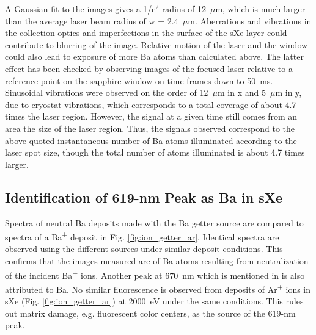 \documentclass[aps,pra,reprint,superscriptaddress]{revtex4-1}
\begin{document}

A Gaussian fit to the images gives a 1/e$^{2}$ radius of 12~$\mu$m, which is much larger than the average laser beam radius of w = 2.4~$\mu$m.  Aberrations and vibrations in the collection optics and imperfections in the surface of the sXe layer could contribute to blurring of the image.  Relative motion of the laser and the window could also lead to exposure of more Ba atoms than calculated above.  The latter effect has been checked by observing images of the focused laser relative to a reference point on the sapphire window on time frames down to 50~ms.  Sinusoidal vibrations were observed on the order of 12~$\mu$m in x and 5~$\mu$m in y, due to cryostat vibrations, which corresponds to a total coverage of about 4.7 times the laser region.  However, the signal at a given time still comes from an area the size of the laser region.  Thus, the signals observed correspond to the above-quoted instantaneous number of Ba atoms illuminated according to the laser spot size, though the total number of atoms illuminated is about 4.7 times larger.



\subsection{Identification of 619-nm Peak as Ba in sXe}

Spectra of neutral Ba deposits made with the Ba getter source are compared to spectra of a Ba\textsuperscript{+} deposit in Fig. \ref{fig:ion_getter_ar}.  Identical spectra are observed using the different sources under similar deposit conditions.  This confirms that the images measured are of Ba atoms resulting from neutralization of the incident Ba\textsuperscript{+} ions.  Another peak at 670~nm which is mentioned in \cite{Mong2015} is also attributed to Ba.  No similar fluorescence is observed from deposits of Ar\textsuperscript{+} ions in sXe (Fig. \ref{fig:ion_getter_ar}) at 2000~eV under the same conditions.  This rules out matrix damage, e.g. fluorescent color centers, as the source of the 619-nm peak.
\end{document}
